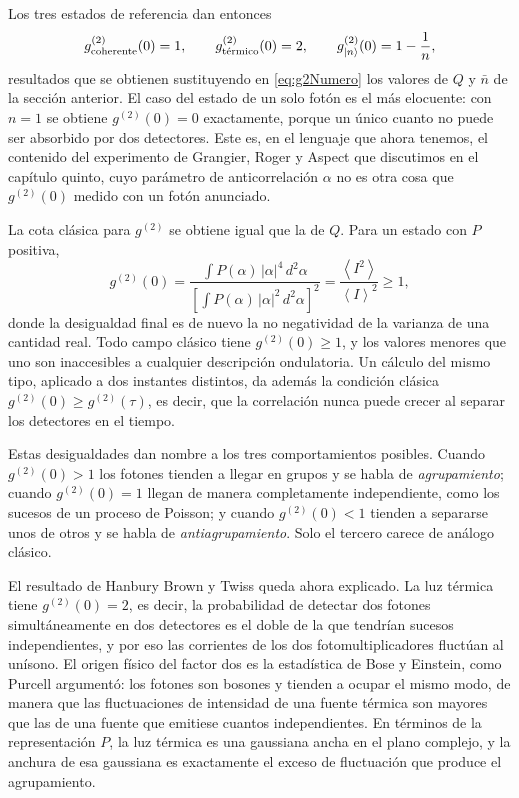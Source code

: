     Los tres estados de referencia dan entonces
    \begin{equation}\label{eq:g2Tres}
        g^{(2)}_{\text{coherente}}(0) = 1,
        \qquad
        g^{(2)}_{\text{térmico}}(0) = 2,
        \qquad
        g^{(2)}_{\ket{n}}(0) = 1 - \frac{1}{n},
    \end{equation}
    resultados que se obtienen sustituyendo en \eqref{eq:g2Numero} los valores de $Q$ y $\bar{n}$ de la sección anterior. El caso del estado de un solo fotón es el más elocuente: con $n=1$ se obtiene $g^{(2)}(0)=0$ exactamente, porque un único cuanto no puede ser absorbido por dos detectores. Este es, en el lenguaje que ahora tenemos, el contenido del experimento de Grangier, Roger y Aspect que discutimos en el capítulo quinto, cuyo parámetro de anticorrelación $\alpha$ no es otra cosa que $g^{(2)}(0)$ medido con un fotón anunciado.

    La cota clásica para $g^{(2)}$ se obtiene igual que la de $Q$. Para un estado con $P$ positiva,
    \begin{equation}\label{eq:g2Clasico}
        g^{(2)}(0) = \frac{\displaystyle\int P(\alpha)\,|\alpha|^{4}\,d^{2}\alpha}{\left[\displaystyle\int P(\alpha)\,|\alpha|^{2}\,d^{2}\alpha\right]^{2}}
        = \frac{\left\langle I^{2}\right\rangle}{\left\langle I\right\rangle^{2}} \geq 1,
    \end{equation}
    donde la desigualdad final es de nuevo la no negatividad de la varianza de una cantidad real. Todo campo clásico tiene $g^{(2)}(0)\geq 1$, y los valores menores que uno son inaccesibles a cualquier descripción ondulatoria. Un cálculo del mismo tipo, aplicado a dos instantes distintos, da además la condición clásica $g^{(2)}(0) \geq g^{(2)}(\tau)$, es decir, que la correlación nunca puede crecer al separar los detectores en el tiempo.

    Estas desigualdades dan nombre a los tres comportamientos posibles. Cuando $g^{(2)}(0) > 1$ los fotones tienden a llegar en grupos y se habla de \textit{agrupamiento}; cuando $g^{(2)}(0) = 1$ llegan de manera completamente independiente, como los sucesos de un proceso de Poisson; y cuando $g^{(2)}(0) < 1$ tienden a separarse unos de otros y se habla de \textit{antiagrupamiento}. Solo el tercero carece de análogo clásico.

    El resultado de Hanbury Brown y Twiss queda ahora explicado. La luz térmica tiene $g^{(2)}(0)=2$, es decir, la probabilidad de detectar dos fotones simultáneamente en dos detectores es el doble de la que tendrían sucesos independientes, y por eso las corrientes de los dos fotomultiplicadores fluctúan al unísono. El origen físico del factor dos es la estadística de Bose y Einstein, como Purcell argumentó: los fotones son bosones y tienden a ocupar el mismo modo, de manera que las fluctuaciones de intensidad de una fuente térmica son mayores que las de una fuente que emitiese cuantos independientes. En términos de la representación $P$, la luz térmica es una gaussiana ancha en el plano complejo, y la anchura de esa gaussiana es exactamente el exceso de fluctuación que produce el agrupamiento.

